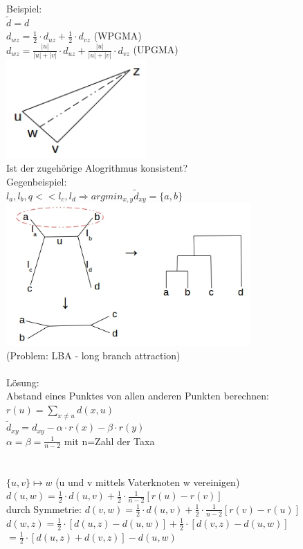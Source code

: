 Beispiel:\\
$\tilde d = d$\\
$d_{wz}=\frac{1}{2} \cdot d_{uz} + \frac{1}{2} \cdot d_{vz}$ (WPGMA)\\
$d_{wz}=\frac{|u|}{|u| + |v|} \cdot d_{uz} + \frac{|u|}{|u| + |v|} \cdot d_{vz}$ (UPGMA)\\
\includegraphics[width=0.4\textwidth]{lectures/161221/pix/2.jpg}\\
Ist der zugehörige Alogrithmus konsistent?\\
Gegenbeispiel:\\
$l_a,l_b,q << l_c,l_d \Rightarrow argmin_{x,y} \tilde d_{xy}=\{a,b\}$\\
\includegraphics[width=0.7\textwidth]{lectures/161221/pix/3.jpg}\\
(Problem: LBA - long branch attraction)\\\\
Lösung:\\
Abstand eines Punktes von allen anderen Punkten berechnen:$r(u)=\displaystyle \sum_{x \neq u}d(x,u)$\\
$\tilde d_{xy}=d_{xy}-\alpha \cdot r(x) - \beta \cdot r(y)$\\
$\alpha = \beta = \frac{1}{n-2}$ mit n=Zahl der Taxa\\

\\\\
$\{u,v\} \mapsto w$ (u und v mittels Vaterknoten w vereinigen)\\
$d(u,w)=\frac{1}{2} \cdot d(u,v) + \frac{1}{2} \cdot \frac{1}{n-2}[r(u)-r(v)]$\\
durch Symmetrie:
$d(v,w)=\frac{1}{2} \cdot d(u,v) + \frac{1}{2} \cdot \frac{1}{n-2}[r(v)-r(u)]$\\
$d(w,z)=\frac{1}{2} \cdot [d(u,z) - d(u,w)] + \frac{1}{2} \cdot [d(v,z)-d(u,w)]$\\
$=\frac{1}{2} \cdot [d(u,z) + d(v,z)] - d(u,w)$\\

